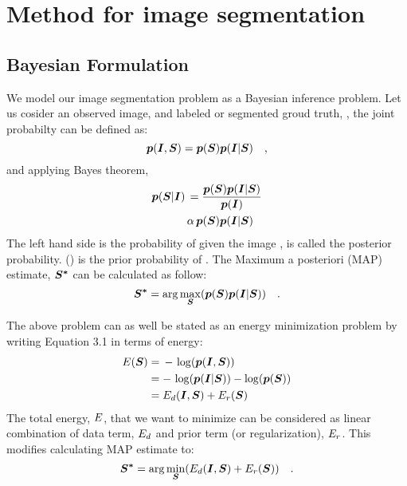 %
\newpage
\chapter{Method for image segmentation}
\section{Bayesian Formulation}
We model our image segmentation problem as a Bayesian inference problem.
Let us cosider an observed image,  and labeled or segmented groud truth, , the joint probabilty can be defined as:
\begin{equation*}
\boldsymbol{p}(\boldsymbol{I}, \boldsymbol{S}) = \boldsymbol{p}(\boldsymbol{S}) \boldsymbol{p}(\boldsymbol{I}|\boldsymbol{S}) \quad ,
\end{equation*}
and applying Bayes theorem,
\begin{align*}
\boldsymbol{p}(\boldsymbol{S}|\boldsymbol{I}) \, & = \frac{\boldsymbol{p}(\boldsymbol{S}) \boldsymbol{p}(\boldsymbol{I}|\boldsymbol{S})}{\boldsymbol{p}(\boldsymbol{I})} \\
						& \alpha \, {\boldsymbol{p}(\boldsymbol{S}) \boldsymbol{p}(\boldsymbol{I}|\boldsymbol{S})}
\end{align*}
The left hand side is the probability of  given the image , is called the
posterior probability. \p() is the prior probability of . The Maximum a posteriori (MAP) estimate, $\boldsymbol{S^*}$ can be calculated as follow:
\begin{equation}
\boldsymbol{S^*} = \arg\max_{\boldsymbol{S}}({\boldsymbol{p}(\boldsymbol{S}) \boldsymbol{p}(\boldsymbol{I}|\boldsymbol{S})}) \quad .
\end{equation}

The above problem can as well be stated as an energy minimization problem by
writing Equation 3.1 in terms of energy:
\begin{align*}
\mathop{{}E}(\boldsymbol{S}) &=\, - \, \log(\boldsymbol{p}(\boldsymbol{I}, \boldsymbol{S})) \\
&= -\, \log(\boldsymbol{p}(\boldsymbol{I}|\boldsymbol{S})) - \log(\boldsymbol{p}(\boldsymbol{S})) \\
&= \mathop{{}E_d}(\boldsymbol{I}, \boldsymbol{S}) + \mathop{{}E_r} (\boldsymbol{S})
\end{align*}
The total energy, $\mathop{{}E}$, that we want to minimize can be considered as linear combination of data term, $\mathop{{}E_d}$ and prior term (or regularization), $\mathop{{}E_r}$. This modifies calculating MAP estimate to:
\begin{equation*}
\boldsymbol{S^*} = \arg\min_{\boldsymbol{S}}({\mathop{{}E_d}(\boldsymbol{I}, \boldsymbol{S}) + \mathop{{}E_r} (\boldsymbol{S})}) \quad .
\end{equation*}

